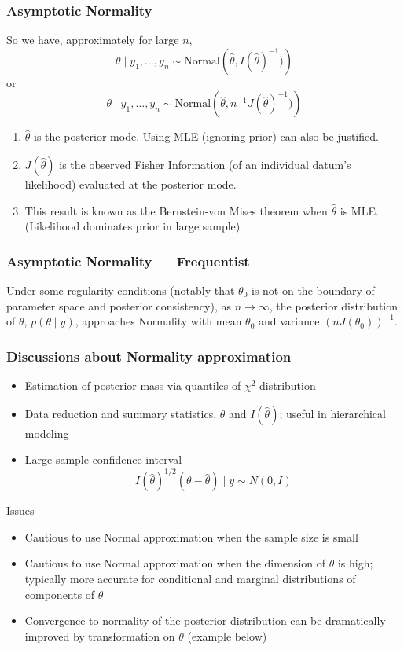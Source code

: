 \documentclass{beamer}
\begin{document}
\begin{frame}
\frametitle{Asymptotic Normality}


So we have, approximately for large $n$,
\[
\theta \mid y_1, \ldots, y_n \sim \text{Normal}\left(\hat{\theta} , I(\hat{\theta})^{-1} )\right)
\]
or
\[
\theta \mid y_1, \ldots, y_n \sim \text{Normal}\left(\hat{\theta} , n^{-1}J(\hat{\theta})^{-1} )\right)
\]
\begin{enumerate}
\item $\hat{\theta}$ is the posterior mode. Using MLE (ignoring prior)
  can also be justified. 
\item $J(\hat{\theta})$ is the observed Fisher Information (of an individual datum's likelihood) evaluated at the posterior mode.
\item This result is known as the Bernstein-von Mises theorem when
  $\hat{\theta}$ is MLE. (Likelihood dominates prior in large sample)
\end{enumerate}
\end{frame}


\begin{frame}
  \frametitle{Asymptotic Normality --- Frequentist}
  Under some regularity conditions (notably that $\theta_0$ is not on
  the boundary of parameter space and posterior consistency), as $n \rightarrow \infty$, the
  posterior distribution of $\theta$, $p(\theta \mid y)$, approaches Normality with mean
  $\theta_0$ and variance $(n J(\theta_0))^{-1}$.
\end{frame}


\begin{frame}
  \frametitle{Discussions about Normality approximation}
  \begin{itemize}
  \item Estimation of posterior mass via quantiles of $\chi^2$
    distribution 
\pause
  \item Data reduction and summary statistics, $\hat{\theta}$ and
    $I(\hat{\theta})$; useful in hierarchical modeling
\pause
\item Large sample confidence interval 
\[
 I(\hat{\theta})^{1/2}(\theta - \hat{\theta}) \mid y \sim N(0, I)
\]
\end{itemize}
\pause
Issues
\begin{itemize}
\item Cautious to use Normal approximation when the sample size is
  small
\pause
\item Cautious to use Normal approximation when the dimension of
  $\theta$ is high; typically more accurate for conditional
  and marginal distributions of components of $\theta$  
\pause
\item Convergence to normality of the posterior distribution can be
  dramatically improved by transformation on $\theta$ (example below)
  \end{itemize}
\end{frame}
\end{document}
